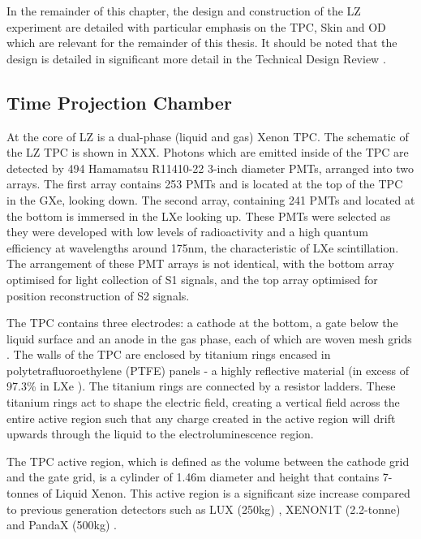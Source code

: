 \par
In the remainder of this chapter, the design and construction of the LZ experiment are detailed with particular emphasis on the TPC, Skin and OD which are relevant for the remainder of this thesis. 
It should be noted that the design is detailed in significant more detail in the Technical Design Review \cite{LZ_TechnicalDesignReview_ref}.

\subsection{Time Projection Chamber}
\label{sec:lz_tpc}
\par
At the core of LZ is a dual-phase (liquid and gas) Xenon TPC.
The schematic of the LZ TPC is shown in XXX.
Photons which are emitted inside of the TPC are detected by 494 Hamamatsu R11410-22 3-inch diameter PMTs, arranged into two arrays.
The first array contains 253 PMTs and is located at the top of the TPC in the GXe, looking down.
The second array, containing 241 PMTs and located at the bottom is immersed in the LXe looking up.
These PMTs were selected as they were developed with low levels of radioactivity and a high quantum efficiency at wavelengths around 175nm, the characteristic of LXe scintillation.
The arrangement of these PMT arrays is not identical, with the bottom array optimised for light collection of S1 signals, and the top array optimised for position reconstruction of S2 signals.
\par
The TPC contains three electrodes: a cathode at the bottom, a gate below the liquid surface and an anode in the gas phase, each of which are woven mesh grids \cite{lz_grids_ref}.
The walls of the TPC are enclosed by titanium rings encased in polytetrafluoroethylene (PTFE) panels - a highly reflective material (in excess of 97.3\% in LXe \cite{ptfe_lxe_reflectivity_ref}).
The titanium rings are connected by a resistor ladders.
These titanium rings act to shape the electric field, creating a vertical field across the entire active region such that any charge created in the active region will drift upwards through the liquid to the electroluminescence region.
\par
The TPC active region, which is defined as the volume between the cathode grid and the gate grid, is a cylinder of 1.46m diameter and height that contains 7-tonnes of Liquid Xenon.
This active region is a significant size increase compared to previous generation detectors such as LUX (250kg) \cite{lux_ref}, XENON1T (2.2-tonne) \cite{xenon1t_ref} and PandaX (500kg) \cite{pandax_ref}.
